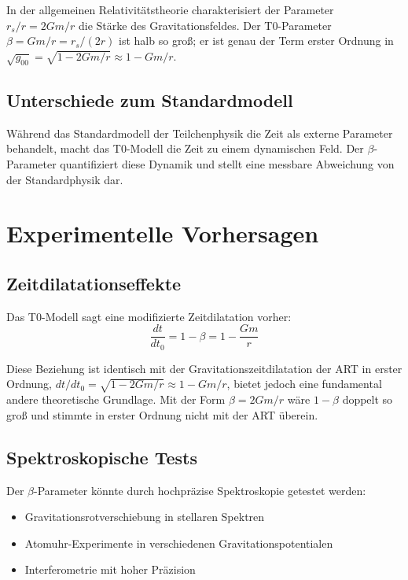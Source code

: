 	In der allgemeinen Relativitätstheorie charakterisiert der Parameter $r_s/r = 2Gm/r$ die Stärke des Gravitationsfeldes. Der T0-Parameter $\beta = Gm/r = r_s/(2r)$ ist halb so groß; er ist genau der Term erster Ordnung in $\sqrt{g_{00}} = \sqrt{1 - 2Gm/r} \approx 1 - Gm/r$.
	
	\subsection{Unterschiede zum Standardmodell}
	\label{subsec:sm_differences}
	
	Während das Standardmodell der Teilchenphysik die Zeit als externe Parameter behandelt, macht das T0-Modell die Zeit zu einem dynamischen Feld. Der $\beta$-Parameter quantifiziert diese Dynamik und stellt eine messbare Abweichung von der Standardphysik dar.
	
	\section{Experimentelle Vorhersagen}
	\label{sec:experimental_predictions}
	
	\subsection{Zeitdilatationseffekte}
	\label{subsec:time_dilation}
	
	Das T0-Modell sagt eine modifizierte Zeitdilatation vorher:
	\begin{equation}
		\frac{dt}{dt_0} = 1 - \beta = 1 - \frac{Gm}{r}
	\end{equation}
	
	Diese Beziehung ist identisch mit der Gravitationszeitdilatation der ART in erster Ordnung, $dt/dt_0 = \sqrt{1 - 2Gm/r} \approx 1 - Gm/r$, bietet jedoch eine fundamental andere theoretische Grundlage. Mit der Form $\beta = 2Gm/r$ wäre $1 - \beta$ doppelt so groß und stimmte in erster Ordnung nicht mit der ART überein.
	
	\subsection{Spektroskopische Tests}
	\label{subsec:spectroscopic_tests}
	
	Der $\beta$-Parameter könnte durch hochpräzise Spektroskopie getestet werden:
	\begin{itemize}
		\item Gravitationsrotverschiebung in stellaren Spektren
		\item Atomuhr-Experimente in verschiedenen Gravitationspotentialen
		\item Interferometrie mit hoher Präzision
	\end{itemize}
	
